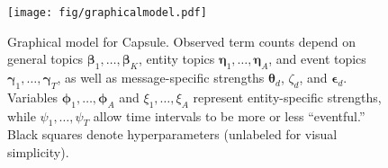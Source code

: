 \begin{figure}[bt]
\centering
\texttt{[image: fig/graphicalmodel.pdf]}
\caption{Graphical model for Capsule. Observed term counts depend on
  general topics $\mathbold{\beta}_1, \ldots, \mathbold{\beta}_K$,
  entity topics $\mathbold{\eta}_1, \ldots, \mathbold{\eta}_A$, and
  event topics $\mathbold{\gamma}_1, \ldots, \mathbold{\gamma}_T$, as
  well as message-specific strengths $\mathbold{\theta}_d$, $\zeta_d$,
  and $\mathbold{\epsilon}_d$.  Variables $\mathbold{\phi}_1, \ldots,
  \mathbold{\phi}_A$ and $\xi_1, \ldots, \xi_A$ represent
  entity-specific strengths, while $\psi_1, \ldots, \psi_T$ allow time
  intervals to be more or less ``eventful.'' Black squares denote
  hyperparameters (unlabeled for visual simplicity).}
\label{fig:graphicalmodel}
\end{figure}

